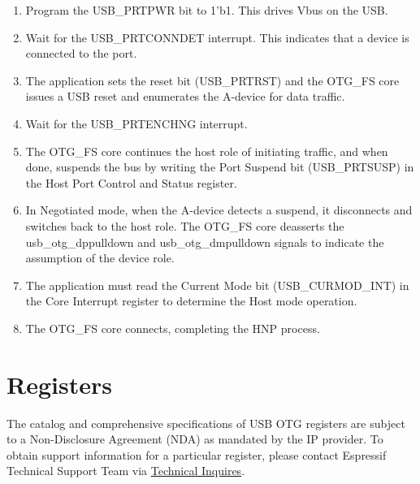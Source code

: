 \documentclass[main\_\_EN.tex]{subfiles}
\begin{document}
\begin{enumerate}
\begin{enumerate}
    \end{enumerate}
    \item Program the USB\_PRTPWR bit to 1’b1. This drives Vbus on the USB.
    \item Wait for the USB\_PRTCONNDET interrupt. This indicates that a device is connected to the port.
    \item The application sets the reset bit (USB\_PRTRST) and the OTG\_FS core issues a USB reset and enumerates the A-device for data traffic.
    \item Wait for the USB\_PRTENCHNG interrupt.
    \item The OTG\_FS core continues the host role of initiating traffic, and when done, suspends the bus by writing the Port Suspend bit (USB\_PRTSUSP) in the Host Port Control and Status register.
    \item In Negotiated mode, when the A-device detects a suspend, it disconnects and switches back to the host role. The OTG\_FS core deasserts the usb\_otg\_dppulldown and usb\_otg\_dmpulldown signals to indicate the assumption of the device role.
    \item The application must read the Current Mode bit (USB\_CURMOD\_INT) in the Core Interrupt register to determine the Host mode operation.
    \item The OTG\_FS core connects, completing the HNP process.
\end{enumerate}

\section{Registers}

The catalog and comprehensive specifications of USB OTG registers are subject to a Non-Disclosure Agreement (NDA) as mandated by the IP provider. To obtain support information for a particular register, please contact Espressif Technical Support Team via \href{https://www.espressif.com/en/contact-us/technical-inquiries}{Technical Inquires}.
\end{document}
